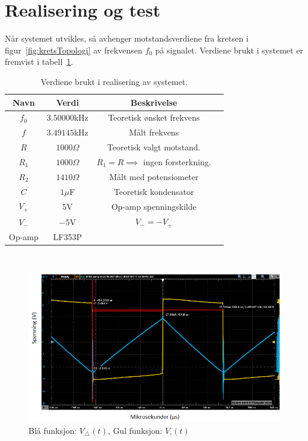 \documentclass[a4paper,11pt,norsk]{article}
\begin{document}
\section{Realisering og test}
\label{sec:realisering}
Når systemet utvikles, så avhenger motstandsverdiene fra kretsen i  figur~\ref{fig:kretsTopologi} av frekvensen $f_0$ på signalet.
Verdiene brukt i systemet er fremvist i tabell~\ref{table:variabler}.
\\
\begin{table}[htbp]
\centering
\begin{tabular}{ |c|c|c|c| } 
\hline
\textbf{Navn} & \textbf{Verdi} & \textbf{Beskrivelse}\\
\hline
$f_0$ & $3.50000$kHz & Teoretisk ønsket frekvens  \\
\hline
$f$ & $3.49145$kHz & Målt frekvens \\
\hline
$R$ & $1000 \Omega$ & Teoretisk valgt motstand.  \\ 
\hline
$R_1$ & $1000 \Omega$ & $R_1 = R \implies $ ingen forsterkning. \\ 
\hline
$R_2$ & $1410\Omega$ & Målt med potensiometer \\
\hline
$C$ & $1\mu$F & Teoretisk kondensator \\
\hline
$V_+$ & $5$V & Op-amp spenningskilde \\
\hline
$V_-$ & $-5$V & $V_- = -V_+$ \\
\hline
Op-amp & LF353P & \\

\hline
\end{tabular}
\caption{Verdiene brukt i realisering av systemet.}
\label{table:variabler}
\end{table}
\\
\begin{figure}[htbp]
    \centering
    \includegraphics[width=1.0\textwidth]{img/Oscilloskop.png}
    \caption{Blå funksjon: $V_\triangle (t)$, Gul funksjon: $V_\square (t)$}
    \label{fig:triangularWave}
\end{figure}
\end{document}
